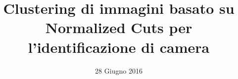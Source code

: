 \documentclass{beamer}
\author{}
\title{\huge Clustering di immagini basato su Normalized Cuts per l’identificazione di camera}
\date{28 Giugno 2016}
\begin{document}
\titlepageframe






\end{document}
